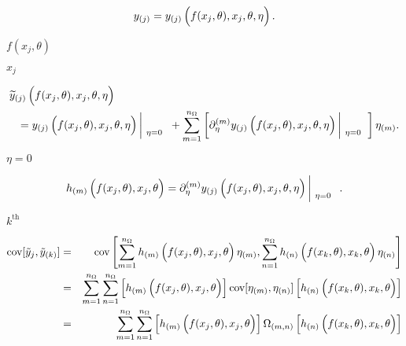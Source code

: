 \documentclass{article}
\begin{document}
\[ y_{(j)} = y_{(j)}\left( \rule{0.0in}{0.15in} f(x_j, \theta), x_j, \theta, \eta \right) . \]
\pagebreak

$f(x_j, \theta)$
\pagebreak

$x_j$
\pagebreak

\begin{eqnarray} \lefteqn{ \widetilde{y}_{(j)} \left( \rule{0.0in}{0.15in} f(x_j, \theta), x_j, \theta, \eta \right) } \nonumber \\ & & = y_{(j)}\left( \rule{0.0in}{0.15in} f(x_j, \theta), x_j, \theta, \eta \right) \left| \! \begin{array}{l} \\ {\scriptstyle \eta = 0} \end{array} \right. + \sum_{m=1}^{n_{\Omega}} \left[ \partial_{\eta}^{(m)} y_{(j)}\left( \rule{0.0in}{0.15in} f(x_j, \theta), x_j, \theta, \eta \right) \left| \! \begin{array}{l} \\ {\scriptstyle \eta = 0} \end{array} \right. \right] \eta_{(m)} . \end{eqnarray}
\pagebreak

$\eta = 0$
\pagebreak

\[ h_{(m)}\left( \rule{0.0in}{0.15in} f(x_j, \theta), x_j, \theta \right) = \partial_{\eta}^{(m)} y_{(j)}\left( \rule{0.0in}{0.15in} f(x_j, \theta), x_j, \theta, \eta \right) \left| \! \begin{array}{l} \\ {\scriptstyle \eta = 0} \end{array} \right. . \]
\pagebreak

$k^{\mbox{th}}$
\pagebreak

\begin{eqnarray} \mbox{cov} [ \tilde{y}_j , \tilde{y}_{(k)} ] & = & \mbox{cov} \left[ \sum_{m=1}^{n_{\Omega}} h_{(m)}\left( \rule{0.0in}{0.15in} f(x_j, \theta), x_j, \theta \right) \eta_{(m)}, \sum_{n=1}^{n_{\Omega}} h_{(n)}\left( \rule{0.0in}{0.15in} f(x_{k}, \theta), x_{k}, \theta \right) \eta_{(n)} \right] \\ & = & \sum_{m=1}^{n_{\Omega}} \sum_{n=1}^{n_{\Omega}} \left[ h_{(m)}\left( \rule{0.0in}{0.15in} f(x_j, \theta), x_j, \theta \right) \right] \mbox{cov} [ \eta_{(m)} , \eta_{(n)} ] \left[ h_{(n)}\left( \rule{0.0in}{0.15in} f(x_{k}, \theta), x_{k}, \theta \right) \right] \\ & = & \sum_{m=1}^{n_{\Omega}} \sum_{n=1}^{n_{\Omega}} \left[ h_{(m)}\left( \rule{0.0in}{0.15in} f(x_j, \theta), x_j, \theta \right) \right] \Omega_{(m,n)} \left[ h_{(n)}\left( \rule{0.0in}{0.15in} f(x_{k}, \theta), x_{k}, \theta \right) \right] \end{eqnarray}
\pagebreak
\end{document}
